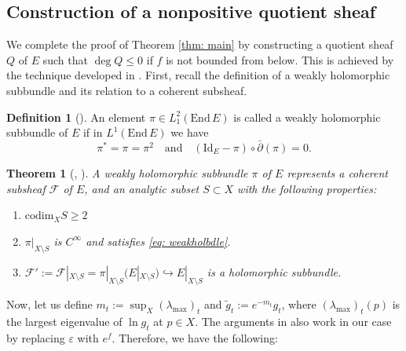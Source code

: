 \documentclass[a4, 12pt, 
]{amsart}
\numberwithin{equation}{section}
\theoremstyle{plain}
\newtheorem{thm}[equation]{Theorem}
\theoremstyle{definition}
\newtheorem{defn}[equation]{Definition}
\theoremstyle{remark}
\begin{document}
\subsection{Construction of a nonpositive quotient sheaf}\label{sec: comp}
We complete the proof of Theorem \ref{thm: main} by constructing a quotient sheaf $Q$ of $E$ such that $\deg Q\le0$ if $f$ is not bounded from below. This is achieved by the technique developed in \cite{UY}. First, recall the definition of a weakly holomorphic subbundle and its relation to a coherent subsheaf.

\begin{defn}[{\cite[Definition 3.4.2]{LT}}]
    An element $\pi\in L^2_1(\mathrm{End}\, E)$ is called a weakly holomorphic subbundle of $E$ if in $L^1(\mathrm{End}\, E)$ we have
    \begin{equation}\label{eq: weakholbdle}
        \pi^*=\pi=\pi^2 \quad \mathrm{and} \quad (\mathrm{Id}_E-\pi)\circ\bar{\partial}(\pi)=0.
    \end{equation}
\end{defn}

\begin{thm}[{\cite[Theorem 3.4.3]{LT}, \cite[S290-292]{UY}}]\label{thm: weakhol}
    A weakly holomorphic subbundle $\pi$ of $E$ represents a coherent subsheaf $\mathcal{F}$ of $E$, and an analytic subset $S\subset X$ with the following properties:
    \begin{enumerate}[font=\normalfont]
        \item $\mathrm{codim}_XS\ge2$
        \item\label{item: reg} $\pi|_{X\setminus S}$ is $C^\infty$ and satisfies \eqref{eq: weakholbdle}.
        \item \label{item: subbdl}$\mathcal{F}':=\mathcal{F}|_{X\setminus S}=\pi|_{X\setminus S}(E|_{X\setminus S})\hookrightarrow E|_{X\setminus S}$ is a holomorphic subbundle.
    \end{enumerate}
\end{thm}

Now, let us define $m_t:=\sup_X (\lambda_{\mathrm{max}})_t$ and $\tilde{g}_t:=e^{-m_t} g_t$,
where $(\lambda_{\mathrm{max}})_t(p)$ is the largest eigenvalue of $\ln g_t$ at $p\in X$.
The arguments in \cite[Lemma 4.1 and Proposition 4.1]{UY} also work in our case by replacing $\varepsilon$ with $e^f$. Therefore, we have the following:
\end{document}
